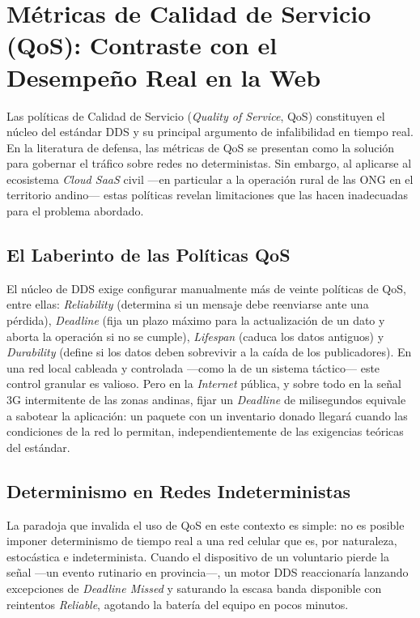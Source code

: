 \section{Métricas de Calidad de Servicio (QoS): Contraste con el Desempeño Real en la Web}

Las políticas de Calidad de Servicio (\textit{Quality of Service}, QoS) constituyen
el núcleo del estándar DDS y su principal argumento de infalibilidad en tiempo real.
En la literatura de defensa, las métricas de QoS se presentan como la solución para
gobernar el tráfico sobre redes no deterministas. Sin embargo, al aplicarse al
ecosistema \textit{Cloud SaaS} civil ---en particular a la operación rural de las
ONG en el territorio andino--- estas políticas revelan limitaciones que las hacen
inadecuadas para el problema abordado.

\subsection{El Laberinto de las Políticas QoS}

El núcleo de DDS exige configurar manualmente más de veinte políticas de QoS, entre
ellas: \textit{Reliability} (determina si un mensaje debe reenviarse ante una
pérdida), \textit{Deadline} (fija un plazo máximo para la actualización de un dato y
aborta la operación si no se cumple), \textit{Lifespan} (caduca los datos antiguos)
y \textit{Durability} (define si los datos deben sobrevivir a la caída de los
publicadores). En una red local cableada y controlada ---como la de un sistema
táctico--- este control granular es valioso. Pero en la \textit{Internet} pública, y
sobre todo en la señal $3\text{G}$ intermitente de las zonas andinas, fijar un
\textit{Deadline} de milisegundos equivale a sabotear la aplicación: un paquete con
un inventario donado llegará cuando las condiciones de la red lo permitan,
independientemente de las exigencias teóricas del estándar.

\subsection{Determinismo en Redes Indeterministas}

La paradoja que invalida el uso de QoS en este contexto es simple: no es posible
imponer determinismo de tiempo real a una red celular que es, por naturaleza,
estocástica e indeterminista. Cuando el dispositivo de un voluntario pierde la señal
---un evento rutinario en provincia---, un motor DDS reaccionaría lanzando
excepciones de \textit{Deadline Missed} y saturando la escasa banda disponible con
reintentos \textit{Reliable}, agotando la batería del equipo en pocos minutos.

